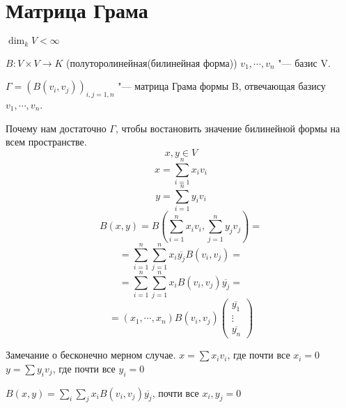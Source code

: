 ﻿\section{Матрица Грама}
\begin{Def}
$\dim_k V < \infty$

$B \colon V \times V \to K$ (полуторолинейная(билинейная форма))
$v_1, \cdots, v_n$ "--- базис V.

$\Gamma = (B(v_i, v_j))_{i,j = 1,n}$ "--- матрица Грама формы B, отвечающая базису $v_1, \cdots, v_n$.
\end{Def}


Почему нам достаточно $\Gamma$, чтобы востановить значение билинейной формы на всем пространстве.
$$x, y \in V$$
$$x = \sum_{i = 1}^{n}x_i v_i$$
$$y = \sum_{i = 1}^{n}y_i v_i$$
$$B(x, y) = B(\sum_{i = 1}^{n}x_iv_i, \sum_{j = 1}^{n} y_{j}v_j) = $$
$$= \sum_{i = 1}^{n}\sum_{j = 1}^{n}x_i \overline{y_j} B(v_i, v_j) = $$
$$= \sum_{i = 1}^{n}\sum_{j = 1}^{n}x_i B(v_i, v_j)\overline{y_j} = $$
$$= (x_1, \cdots, x_n) B(v_i, v_j) \begin{pmatrix}\overline{y_1}\\ \vdots \\ \overline{y_n} \end{pmatrix} $$

\begin{Rem}
Замечание о бесконечно мерном случае.
$x = \sum x_i v_i$, где почти все $x_i = 0$
$y = \sum y_i v_j$, где почти все $y_i = 0$ 

$B(x, y) = \sum_i \sum_j x_i B(v_i, v_j) \overline{y_j}$, почти все $x_i, y_j = 0$
\end{Rem}

